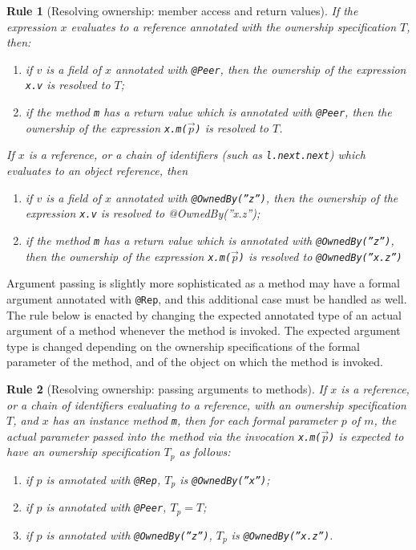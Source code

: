 \documentclass{pracamgr}
\theoremstyle{break}
\theoremstyle{break}
\theoremstyle{break}
\newtheorem{verrule}{Rule}
\begin{document}
\begin{verrule}[Resolving ownership: member access and return values]
  \label{vrl:res:acc}
  If the expression $x$ evaluates to a reference annotated with
  the ownership specification $T$, then:
  \begin{enumerate}[label=(\arabic*)]
  \item if $v$ is a field of $x$ annotated with \texttt{@Peer}, then
    the ownership of the expression \texttt{x.v} is resolved to $T$;
  \item \label{pnt:peer-ret} if the method \texttt{m} has a return value which is annotated
    with \texttt{@Peer}, then the ownership of the expression
    \texttt{x.m($\vec{p}$)} is resolved to $T$.
  \end{enumerate}
  If $x$ is a reference, or a chain of identifiers (such as
  \texttt{l.next.next}) which evaluates to an object reference, then
  \begin{enumerate}[label=(\arabic*), resume]
  \item if $v$ is a field of $x$ annotated with
    \texttt{@OwnedBy(''z'')}, then the ownership of the expression
    \texttt{x.v} is resolved to @OwnedBy(''x.z'');
  \item if the method \texttt{m} has a return value which is
    annotated with \texttt{@OwnedBy(''z'')}, then the ownership of
    the expression \texttt{x.m($\vec{p}$)} is resolved to
    \texttt{@OwnedBy(''x.z'')}
  \end{enumerate}
\end{verrule}

Argument passing is slightly more sophisticated as a method may have a
formal argument annotated with \texttt{@Rep}, and this additional case
must be handled as well. The rule below is enacted by changing the
expected annotated type of an actual argument of a method whenever the
method is invoked. The expected argument type is changed depending on
the ownership specifications of the formal parameter of the method,
and of the object on which the method is invoked.

\begin{verrule}[Resolving ownership: passing arguments to methods]
  If $x$ is a reference, or a chain of identifiers evaluating to a
  reference, with an ownership specification $T$, and $x$ has an
  instance method \texttt{m}, then for each formal parameter $p$ of
  $m$, the actual parameter passed into the method via the invocation
  \texttt{x.m($\vec{p}$)} is expected to have an ownership
  specification $T_p$ as follows:
  \begin{enumerate}[label=(\arabic*)]
  \item if $p$ is annotated with \texttt{@Rep}, $T_p$ is \texttt{@OwnedBy(''x'')};
  \item if $p$ is annotated with \texttt{@Peer}, $T_p = T$;
  \item if $p$ is annotated with \texttt{@OwnedBy(''z'')}, $T_p$ is
    \texttt{@OwnedBy(''x.z'')}.
  \end{enumerate}
\end{verrule}
\end{document}
